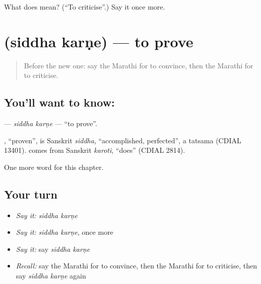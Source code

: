 \begin{tcolorbox}[breakable,colback=teal!4,colframe=teal!35!black,title={Before you move on}]
What does   mean? (\textquotedblleft{}To criticise\textquotedblright{}.) Say it once more.
\end{tcolorbox}
\section[\texorpdfstring{\mr{सिद्ध} \mr{करणे} (siddha karṇe)}{सिद्ध करणे (siddha karṇe)}]{  (siddha karṇe) — to prove}

\label{lesson:MR-C225-siddha-karne}



\begin{quote}
Before the new one: say the Marathi for to convince, then the Marathi for to criticise.
\end{quote}

\subsection*{You'll want to know:  }
\textbf{ } — \emph{siddha karṇe} — \textquotedblleft{}to prove\textquotedblright{}.

\begin{cousinweb}
\textbf{}, \textquotedblleft{}proven\textquotedblright{}, is Sanskrit \emph{siddha}, \textquotedblleft{}accomplished, perfected\textquotedblright{}, a tatsama (CDIAL 13401). \textbf{} comes from Sanskrit \emph{karoti}, \textquotedblleft{}does\textquotedblright{} (CDIAL 2814).
\end{cousinweb}

\begin{grammarlens}[title={What you've built}]
One more word for this chapter.
\end{grammarlens}

\subsection*{Your turn}
\begin{itemize}
\raggedright
  \item \emph{Say it:} \emph{siddha karṇe}
  \item \emph{Say it:} \emph{siddha karṇe}, once more
  \item \emph{Say it:} say \emph{siddha karṇe}
  \item \emph{Recall:} say the Marathi for to convince, then the Marathi for to criticise, then say \emph{siddha karṇe} again
\end{itemize}

